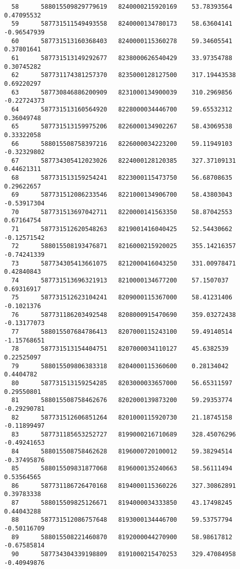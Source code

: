 \documentclass[a4paper,11pt]{article}
\begin{document}
\begin{verbatim}
  58      588015509829779619   8240000215920169    53.78393564    0.47095532   
  59      587731511549493558   8240000134780173    58.63604141    -0.96547939  
  60      587731513160368403   8240000115360278    59.34605541    0.37801641   
  61      587731513149292677   8238000626540429    33.97354788    0.30745282   
  62      587731174381257370   8235000128127500    317.19443538   0.69220297   
  63      587730846886200909   8231000134900039    310.2969856    -0.22724373  
  64      587731513160564920   8228000034446700    59.65532312    0.36049748   
  65      587731513159975206   8226000134902267    58.43069538    0.33322058   
  66      588015508758397216   8226000034223200    59.11949103    -0.32329802  
  67      587734305412023026   8224000128120385    327.37109131   0.44621311   
  68      587731513159254241   8223000115473750    56.68708635    0.29622657   
  69      587731512086233546   8221000134906700    58.43803043    -0.53917304  
  70      587731513697042711   8220000141563350    58.87042553    0.67164754   
  71      587731512620548263   8219001416040425    52.54430662    -0.12571542  
  72      588015508193476871   8216000215920025    355.14216357   -0.74241339  
  73      587734305413661075   8212000416043250    331.00978471   0.42840843   
  74      587731513696321913   8210000134677200    57.1507037     0.69316917   
  75      587731512623104241   8209000115367000    58.41231406    -0.1021376   
  76      587731186203492548   8208000915470690    359.03272438   -0.13177073  
  77      588015507684786413   8207000115243100    59.49140514    -1.15768651  
  78      587731513154404751   8207000034110127    45.6382539     0.22525097   
  79      588015509806383318   8204000115360600    0.28134042     0.4404782    
  80      587731513159254285   8203000033657000    56.65311597    0.29550801   
  81      588015508758462676   8202000139873200    59.29353774    -0.29290781  
  82      587731512606851264   8201000115920730    21.18745158    -0.11899497  
  83      587731185653252727   8199000216710689    328.45076296   -0.49241653  
  84      588015508758462628   8196000720100012    59.38294514    -0.37495876  
  85      588015509831877068   8196000135240663    58.56111494    0.53564565   
  86      587731186726470168   8194000115360226    327.30862891   0.39783338   
  87      588015509825126671   8194000034333850    43.17498245    0.44043288   
  88      587731512086757648   8193000134446700    59.53757794    -0.50116709  
  89      588015508221460870   8192000044270900    58.98617812    -0.67585814  
  90      587734304339198809   8191000215470253    329.47084958   -0.40949876  

\end{verbatim}
\end{document}
